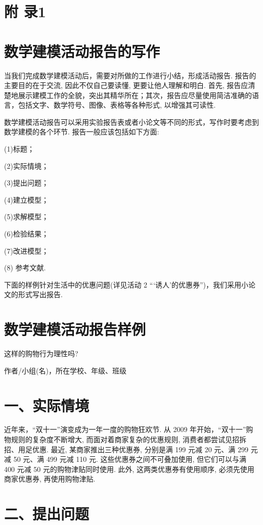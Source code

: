 \documentclass[10pt]{article}
\begin{document}
\section*{附 录1}

\section*{数学建模活动报告的写作}

当我们完成数学建模活动后，需要对所做的工作进行小结，形成活动报告. 报告的主要目的在于交流, 因此不仅自己要读懂, 更要让他人理解和明白. 首先, 报告应清楚地展示建模工作的全貌，突出其精华所在；其次，报告应尽量使用简洁准确的语言，包括文字、数学符号、图像、表格等各种形式, 以增强其可读性.

数学建模活动报告可以采用实验报告表或者小论文等不同的形式，写作时要考虑到数学建模的各个环节. 报告一般应该包括如下方面:

(1)标题；

(2)实际情境；

(3)提出问题；

(4)建立模型；

(5)求解模型；

(6)检验结果；

(7)改进模型；

(8) 参考文献.

下面的样例针对生活中的优惠问题(详见活动 2 “‘诱人’的优惠券”)，我们采用小论文的形式写出报告.

\section*{数学建模活动报告样例}

这样的购物行为理性吗?

作者/小组(名)，所在学校、年级、班级

\section*{一、实际情境}

近年来，“双十一”演变成为一年一度的购物狂欢节. 从 2009 年开始，“双十一”购物规则的复杂度不断增大, 而面对着商家复杂的优惠规则, 消费者都尝试见招拆招、用足优惠. 最近, 某商家推出三种优惠券, 分别是满 199 元减 20 元、满 299 元减 50 元、满 499 元减 110 元. 这些优惠券之间不可叠加使用, 但它们可以与满 400 元减 50 元的购物津贴同时使用. 此外, 这两类优惠券有使用顺序, 必须先使用商家优惠券, 再使用购物津贴.

\section*{二、提出问题}
\end{document}
